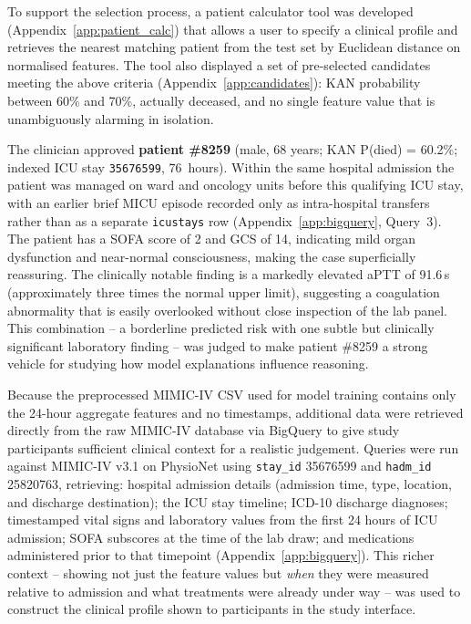 \documentclass[12pt, a4paper]{article}
\begin{document}
To support the selection process, a patient calculator tool was developed
(Appendix~\ref{app:patient_calc}) that allows a user to specify a
clinical profile and retrieves the nearest matching patient from the test
set by Euclidean distance on normalised features. The tool also displayed
a set of pre-selected candidates meeting the above criteria
(Appendix~\ref{app:candidates}): KAN probability between 60\% and 70\%,
actually deceased, and no single feature value that is unambiguously
alarming in isolation.

The clinician approved \textbf{patient \#8259} (male, 68 years; KAN
P(died) = 60.2\%; indexed ICU stay \texttt{35676599}, 76~hours). Within
the same hospital admission the patient was managed on ward and oncology
units before this qualifying ICU stay, with an earlier brief MICU
episode recorded only as intra-hospital transfers rather than as a separate
\texttt{icustays} row (Appendix~\ref{app:bigquery}, Query~3). The patient has a SOFA score of 2 and GCS of 14,
indicating mild organ dysfunction and near-normal consciousness, making
the case superficially reassuring. The clinically notable finding is a
markedly elevated aPTT of 91.6\,s (approximately three times the normal
upper limit), suggesting a coagulation abnormality that is easily
overlooked without close inspection of the lab panel. This combination
-- a borderline predicted risk with one subtle but clinically
significant laboratory finding -- was judged to make patient \#8259 a
strong vehicle for studying how model explanations influence reasoning.

Because the preprocessed MIMIC-IV CSV used for model training contains
only the 24-hour aggregate features and no timestamps, additional data
were retrieved directly from the raw MIMIC-IV database via BigQuery to
give study participants sufficient clinical context for a realistic
judgement. Queries were run against MIMIC-IV v3.1 on PhysioNet using
\texttt{stay\_id} 35676599 and \texttt{hadm\_id} 25820763, retrieving:
hospital admission details (admission time, type, location, and
discharge destination); the ICU stay timeline; ICD-10 discharge
diagnoses; timestamped vital signs and laboratory values from the first
24 hours of ICU admission; SOFA subscores at the time of the lab draw;
and medications administered prior to that timepoint
(Appendix~\ref{app:bigquery}). This richer
context -- showing not just the feature values but \emph{when} they
were measured relative to admission and what treatments were already
under way -- was used to construct the clinical profile shown to
participants in the study interface.
\end{document}
